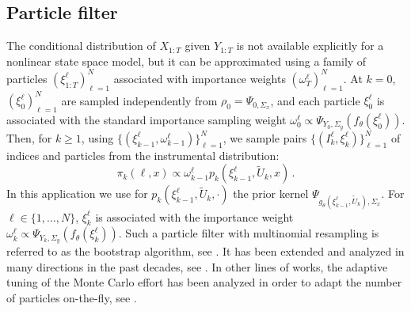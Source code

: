 \documentclass[conference]{IEEEtran}
\begin{document}
\subsection{Particle filter}
The conditional distribution of $X_{1:T}$ given $Y_{1:T}$ is not available explicitly for a nonlinear state space model, but it can be approximated using a family of particles $(\xi^{\ell}_{1:T})_{\ell=1}^N$ associated with importance weights $(\omega^{\ell}_T)_{\ell=1}^N$.
At $k = 0$, $(\xi^{\ell}_0)_{\ell=1}^N$ are sampled independently from $\rho_0 = \Psi_{0, \Sigma_x}$, and each particle $\xi^{\ell}_0$ is associated with the standard importance sampling weight $\omega_0^{\ell} \propto  \Psi_{Y_0, \Sigma_y}(f_\theta(\xi^{\ell}_0))$.
Then, for $k\geq 1$, using $\{(\xi^{\ell}_{k-1},\omega^{\ell}_{k-1})\}_{\ell=1}^N$, we sample pairs $\{(I^{\ell}_k,\xi^{\ell}_{k})\}_{\ell=1}^N$ of indices and particles from the instrumental distribution:
\[
	\pi_{k}(\ell,x) \propto \omega_{k-1}^{\ell} p_k(\xi^{\ell}_{k-1},\widetilde U_k,x)\,.
\]
In this application we use for $p_k(\xi^{\ell}_{k-1},\widetilde U_k,\cdot)$ the prior kernel $\Psi_{g_\theta(\xi^\ell_{k-1}, \tilde U_k), \Sigma_x}$.
For $\ell \in \{1,\ldots,N\}$, $\xi^{\ell}_k$ is associated with the importance weight $\omega^{\ell}_k \propto \Psi_{Y_k, \Sigma_y}(f_\theta(\xi^{\ell}_k))$. Such a particle filter with multinomial resampling is referred to as the bootstrap algorithm, see \cite{gordon1993novel}. It has been extended and analyzed in many directions in the past decades, see \cite{pitt1999filtering,douc2005comparison,Chopin_2020}. In other lines of works, the adaptive tuning of the Monte Carlo effort has been analyzed in order to  adapt the
number of particles on-the-fly, see \cite{elvira2016adapting,elvira2021performance}.
\end{document}
